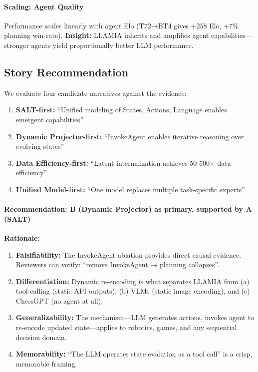\paragraph{Scaling: Agent Quality}
Performance scales linearly with agent Elo (T72→BT4 gives +258 Elo, +7\% planning win-rate).
\textbf{Insight:} LLAMIA inherits and amplifies agent capabilities—stronger agents yield proportionally better LLM performance.

\subsection{Story Recommendation}

We evaluate four candidate narratives against the evidence:

\begin{enumerate}[label=\Alph*., leftmargin=*]
    \item \textbf{SALT-first:} ``Unified modeling of States, Actions, Language enables emergent capabilities''
    \item \textbf{Dynamic Projector-first:} ``InvokeAgent enables iterative reasoning over evolving states''
    \item \textbf{Data Efficiency-first:} ``Latent internalization achieves 50-500$\times$ data efficiency''
    \item \textbf{Unified Model-first:} ``One model replaces multiple task-specific experts''
\end{enumerate}

\paragraph{Recommendation: B (Dynamic Projector) as primary, supported by A (SALT)}

\textbf{Rationale:}
\begin{enumerate}[leftmargin=*, itemsep=2pt]
    \item \textbf{Falsifiability:} The InvokeAgent ablation provides direct causal evidence. Reviewers can verify: ``remove InvokeAgent → planning collapses''.
    \item \textbf{Differentiation:} Dynamic re-encoding is what separates LLAMIA from (a) tool-calling (static API outputs), (b) VLMs (static image encoding), and (c) ChessGPT (no agent at all).
    \item \textbf{Generalizability:} The mechanism—LLM generates actions, invokes agent to re-encode updated state—applies to robotics, games, and any sequential decision domain.
    \item \textbf{Memorability:} ``The LLM operates state evolution as a tool call'' is a crisp, memorable framing.
\end{enumerate}

